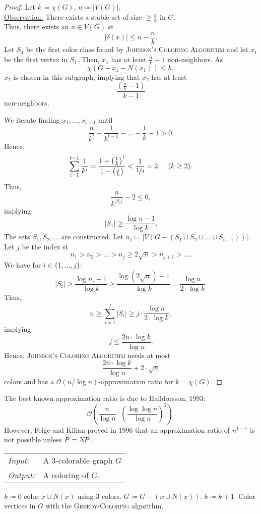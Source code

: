 \documentclass[../skript.tex]{subfiles}
\begin{document}
\begin{proof}
Let $k \coloneqq \chi(G)$, $n \coloneqq |V(G)|$. \\
\underline{Observation:} There exists a stable set of size $\geq \frac{n}{k}$ in $G$. \\
Thus, there exists an $x \in V(G)$ \ac{st}
\[
	|\delta(x)| \leq n - \frac{n}{k}.
\]
Let $S_1$ be the first color class found by \textsc{Johnson's Coloring Algorithm} and let $x_1$ be the first vertex in $S_1$. Then, $x_1$ has at least $\frac{n}{k} - 1$ non-neighbors.
As
\[
	\chi(G - x_1 - N(x_1)) \leq k,
\]
$x_2$ is chosen in this subgraph, implying that $x_2$ has at least
\[
	\frac{ \left( \frac{n}{k} - 1 \right) }{ k - 1 }
\]
non-neighbors.

We iterate finding $x_1, \ldots, x_{t+1}$ until
\[
	\frac{n}{k^t} - \frac{1}{k^{t-1}} - \ldots - \frac{1}{k} - 1 > 0.
\]
Hence,
\[
	\sum_{i=1}^{t-1} \frac{1}{k^i} = \frac{1 - \left( \frac{1}{k} \right)^t}{1 - \left( \frac{1}{k} \right)} < \frac{1}{\sfrac{1}{2}} = 2, \quad (k \geq 2).
\]
Thus,
\[
	\frac{n}{k^{|S_1|}} - 2 \leq 0,
\]
implying
\[
	|S_1| \geq \frac{\log n - 1}{\log k}.
\]
The sets $S_1, S_2, \ldots$ are constructed. Let $n_i \coloneqq |V(G - (S_1 \cup S_2 \cup \ldots \cup S_{i-1}))|$.
Let $j$ be the index \ac{st}
\[
	n_1 > n_2 > \ldots > n_j \geq 2 \sqrt{n} > n_{j+1} > \ldots.
\]
We have for $i \in \{1, \ldots, j\}$:
\[
	|S_i| \geq \frac{\log n_i - 1}{\log k} \geq \frac{\log(2 \sqrt{n}) - 1}{\log k} = \frac{\log n}{2 \cdot \log k}.
\]
Thus,
\[
	n \geq \sum_{i=1}^j |S_i| \geq j \cdot \frac{\log n}{2 \cdot \log k},
\]
implying
\[
	j \leq \frac{2n \cdot \log k}{\log n}.
\]
Hence, \textsc{Johnson's Coloring Algorithm} needs at most
\[
	\frac{2n \cdot \log k}{\log n} + 2 \cdot \sqrt{n}
\]
colors and has a $\mathcal{O}(n/\log n)$-approximation ratio for $k = \chi(G)$.
\end{proof}
The best known approximation ratio is due to Halldorsson, 1993:
\[
	\mathcal{O} \left( \frac{n}{\log n} \cdot \left( \frac{\log \log n}{\log n} \right)^2 \right).
\]
However, Feige and Kilian proved in 1996 that an approximation ratio of $n^{1 - \varepsilon}$ is not possible unless $P = N \! P$.
\begin{algorithm}
\begin{tabular}{@{}ll}
\textit{Input:} & A 3-colorable graph $G$ \\
\textit{Output:} & A coloring of $G$.
\end{tabular}
\begin{algorithmic}[1]
\State $k \coloneqq 0$
	\State color $x \cup N(x)$ using 3 colors.
	\State $G \coloneqq G - (x \cup N(x))$.
	\State $k \coloneqq k + 1$.
\EndWhile
\State Color vertices in $G$ with the \textsc{Greedy-Coloring} algorithm.
\end{algorithmic}
\end{algorithm}
\end{document}
